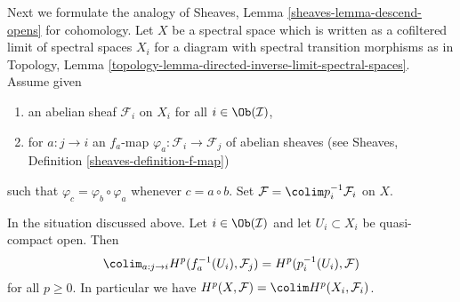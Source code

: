 \noindent
Next we formulate the analogy of
Sheaves, Lemma \ref{sheaves-lemma-descend-opens}
for cohomology.
Let $X$ be a spectral space which is written as a cofiltered limit
of spectral spaces $X_i$ for a diagram with spectral transition morphisms
as in
Topology, Lemma \ref{topology-lemma-directed-inverse-limit-spectral-spaces}.
Assume given
\begin{enumerate}
\item an abelian sheaf $\mathcal{F}_i$ on $X_i$ for all
$i \in \Ob(\mathcal{I})$,
\item for $a : j \to i$ an $f_a$-map
$\varphi_a : \mathcal{F}_i \to \mathcal{F}_j$ of abelian sheaves (see
Sheaves, Definition \ref{sheaves-definition-f-map})
\end{enumerate}
such that $\varphi_c = \varphi_b \circ \varphi_a$
whenever $c = a \circ b$. Set $\mathcal{F} = \colim p_i^{-1}\mathcal{F}_i$
on $X$.

\begin{lemma}
\label{lemma-colimit}
In the situation discussed above.
Let $i \in \Ob(\mathcal{I})$ and let $U_i \subset X_i$ be quasi-compact open.
Then
$$
\colim_{a : j \to i} H^p(f_a^{-1}(U_i), \mathcal{F}_j) =
H^p(p_i^{-1}(U_i), \mathcal{F})
$$
for all $p \geq 0$. In particular we have
$H^p(X, \mathcal{F}) = \colim H^p(X_i, \mathcal{F}_i)$.
\end{lemma}

